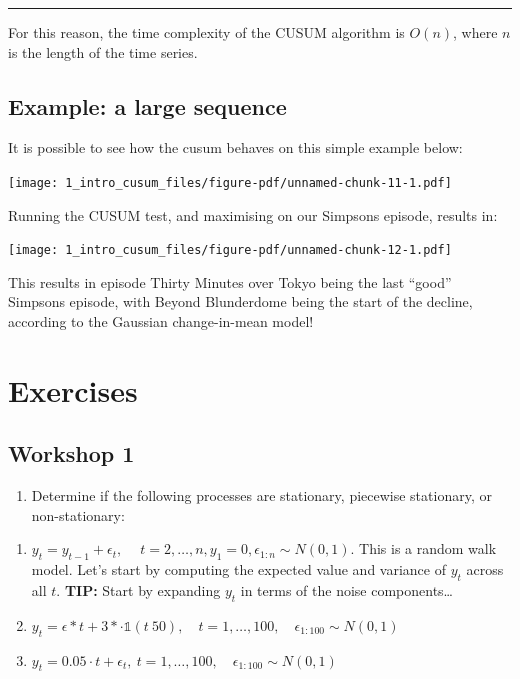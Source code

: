 \documentclass[
  letterpaper,
  DIV=11,
  numbers=noendperiod]{scrreprt}
\providecommand{\tightlist}{%
  \setlength{\itemsep}{0pt}\setlength{\parskip}{0pt}}\usepackage{longtable,booktabs,array}
\begin{document}
\begin{center}\rule{0.5\linewidth}{0.5pt}\end{center}

For this reason, the time complexity of the CUSUM algorithm is \(O(n)\),
where \(n\) is the length of the time series.

\subsection{Example: a large sequence}\label{example-a-large-sequence}

It is possible to see how the cusum behaves on this simple example
below:

\texttt{[image: 1\_intro\_cusum\_files/figure-pdf/unnamed-chunk-11-1.pdf]}

Running the CUSUM test, and maximising on our Simpsons episode, results
in:

\texttt{[image: 1\_intro\_cusum\_files/figure-pdf/unnamed-chunk-12-1.pdf]}

This results in episode Thirty Minutes over Tokyo being the last
``good'' Simpsons episode, with Beyond Blunderdome being the start of
the decline, according to the Gaussian change-in-mean model!

\section{Exercises}\label{exercises}

\subsection{Workshop 1}\label{workshop-1}

\begin{enumerate}
\def\labelenumi{\arabic{enumi}.}
\tightlist
\item
  Determine if the following processes are stationary, piecewise
  stationary, or non-stationary:
\end{enumerate}

\begin{enumerate}
\def\labelenumi{\alph{enumi}.}
\item
  \(y_t = y_{t - 1} + \epsilon_t, \quad \ t = 2, \dots, n, y_1 = 0, \epsilon_{1:n} \sim N(0, 1)\).
  This is a random walk model. Let's start by computing the expected
  value and variance of \(y_t\) across all \(t\). \textbf{TIP:} Start by
  expanding \(y_{t}\) in terms of the noise components\ldots{}
\item
  \(y_t = \epsilon*t + 3* \cdot \mathbb{1}(t \> 50), \quad t = 1, \dots, 100, \quad \epsilon_{1:100} \sim N(0, 1)\)
\item
  \(y_t = 0.05 \cdot t + \epsilon_t, \ t = 1, \dots, 100, \quad \epsilon_{1:100} \sim N(0, 1)\)
\end{enumerate}
\end{document}
